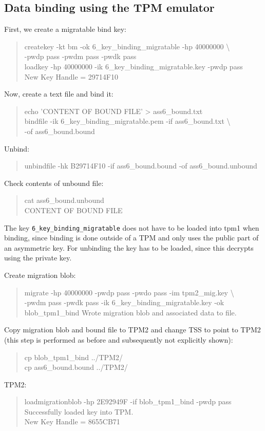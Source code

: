 \documentclass[10pt]{article}
\begin{document}
\subsection{Data binding using the TPM emulator}
First, we create a migratable bind key:
\begin{quote}
createkey -kt bm -ok 6\_key\_binding\_migratable -hp 40000000 \textbackslash \\
-pwdp pass -pwdm pass -pwdk pass \\
loadkey -hp 40000000 -ik 6\_key\_binding\_migratable.key -pwdp pass \\
New Key Handle = 29714F10 \\
\end{quote}

Now, create a text file and bind it:
\begin{quote}
echo 'CONTENT OF BOUND FILE' > ass6\_bound.txt \\
bindfile -ik 6\_key\_binding\_migratable.pem -if ass6\_bound.txt \textbackslash \\
-of ass6\_bound.bound \\
\end{quote}

Unbind:
\begin{quote}
unbindfile -hk B29714F10 -if ass6\_bound.bound -of ass6\_bound.unbound \\
\end{quote}

Check contents of unbound file:
\begin{quote}
cat ass6\_bound.unbound \\
CONTENT OF BOUND FILE
\end{quote}

The key \texttt{6\_key\_binding\_migratable} does not have to be loaded
into tpm1 when binding, since binding is done outside of a TPM and only uses
the public part of an asymmetric key. For unbinding the key has to be loaded,
since this decrypts using the private key.

Create migration blob:
\begin{quote}
migrate -hp 40000000 -pwdp pass -pwdo pass -im tpm2\_mig.key \textbackslash \\
-pwdm pass -pwdk pass -ik 6\_key\_binding\_migratable.key -ok blob\_tpm1\_bind
Wrote migration blob and associated data to file.
\end{quote}

Copy migration blob and bound file to TPM2 and change TSS to point to TPM2 (this step
is performed as before and subsequently not explicitly shown):
\begin{quote}
cp blob\_tpm1\_bind ../TPM2/ \\
cp ass6\_bound.bound ../TPM2/ 
\end{quote}
TPM2:
\begin{quote}
loadmigrationblob -hp 2E92949F -if blob\_tpm1\_bind -pwdp pass \\
Successfully loaded key into TPM. \\
New Key Handle = 8655CB71
\end{quote}
\end{document}

